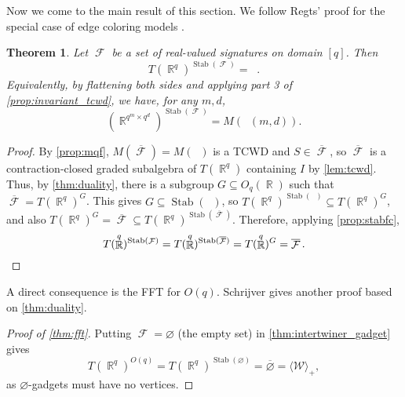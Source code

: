 \documentclass{article}
\newtheorem{theorem}{Theorem}[section]
\theoremstyle{remark}
\theoremstyle{definition}
\DeclareMathOperator{\rr}{\mathbb{R}}
\DeclareMathOperator{\fc}{\mathcal{F}}
\DeclareMathOperator{\qk}{\mathfrak{Q}_{\mathcal{F}}}
\DeclareMathOperator{\ofc}{\overline{\fc}}
\DeclareMathOperator{\stab}{Stab}
\begin{document}
Now we come to the main result of this section. We follow Regts' proof
for the special case of edge coloring models \cite[Theorem 6.8]{regts}.
\begin{theorem}
    \label{thm:intertwiner_gadget}
    Let $\fc$ be a set of real-valued signatures on domain $[q]$. Then
    \[
        T(\rr^q)^{\stab(\fc)} = \ofc.
    \]
    Equivalently, by flattening both sides and applying part 3 of \autoref{prop:invariant_tcwd},
    we have, for any $m,d$,
    \[
        \left(\rr^{q^m\times q^d}\right)^{\stab(\fc)} = M(\qk(m,d)).
    \]
\end{theorem}
\begin{proof}
    By \autoref{prop:mqf}, $M(\overline{\fc}) = M(\qk)$ is a TCWD and
    $S \in \overline{\fc}$, so $\overline{\fc}$ is a contraction-closed
    graded subalgebra of $T(\rr^q)$ containing $I$ by \autoref{lem:tcwd}. Thus, by \autoref{thm:duality},
    there is a subgroup $G \subseteq O_q(\rr)$ such that $\overline{\fc} = T(\rr^q)^G$.
    This gives $G \subseteq \stab(\ofc)$, so $T(\rr^q)^{\stab(\ofc)} \subseteq T(\rr^q)^G$, and 
    also $T(\rr^q)^G = \overline{\fc} \subseteq T(\rr^q)^{\stab(\overline{\fc})}$. Therefore,
    applying \autoref{prop:stabfc},
    \[
        T(\rr^q)^{\stab(\fc)} = T(\rr^q)^{\stab(\ofc)} = T(\rr^q)^G = \ofc.
        \qedhere
    \]
\end{proof}
A direct consequence is the FFT for $O(q)$. Schrijver \cite{schrijver_tensor_2008} gives another 
proof based on \autoref{thm:duality}.
\begin{proof}[Proof of \autoref{thm:fft}]
    Putting $\fc = \varnothing$ (the empty set) in \autoref{thm:intertwiner_gadget} gives
    \[
        T(\rr^q)^{O(q)} = T(\rr^q)^{\stab(\varnothing)} = \overline{\varnothing} = \langle \mathcal{W} \rangle_+,
    \]
    as $\varnothing$-gadgets must have no vertices.
\end{proof}
\end{document}
